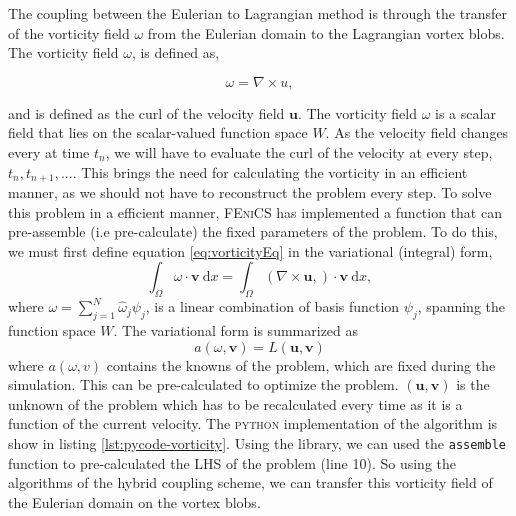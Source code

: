 The coupling between the Eulerian to Lagrangian method is through the transfer of the vorticity field $\omega$ from the Eulerian domain to the Lagrangian vortex blobs. The vorticity field $\omega$, is defined as,

	\begin{equation}
	\omega = \nabla \times u,
	\label{eq:vorticityEq}
	\end{equation}

and is defined as the curl of the velocity field $\mathbf{u}$. The vorticity field $\omega$ is  a scalar field that lies on the scalar-valued function space $W$. As the velocity field changes every at time $t_n$, we will have to evaluate the curl of the velocity at every step, $t_n, t_{n+1}, ...$. This brings the need for calculating the vorticity in an efficient manner, as we should not have to reconstruct the problem every step. To solve this problem in a efficient manner, \textsc{FEniCS} has implemented a function that can pre-assemble (i.e pre-calculate) the fixed parameters of the problem. To do this, we must first define equation \ref{eq:vorticityEq} in the variational (integral) form,  
	\begin{equation}
	\int_{\Omega} \omega \cdot \mathbf{v}\ \mathrm{d}x = \int_{\Omega} (\nabla \times \mathbf{u},) \cdot \mathbf{v}\ \mathrm{d}x,
	\end{equation}
where $\omega = \sum_{j=1}^N \hat{\omega}_j\psi_j$, is a linear combination of basis function $\psi_j$, spanning the function space $W$. The variational form is summarized as
	\begin{equation}
	a(\omega,\mathbf{v}) = L(\mathbf{u},\mathbf{v})
	\end{equation}
where $a(\omega,v)$ contains the knowns of the problem, which are fixed during the simulation. This can be pre-calculated to optimize the problem. $(\mathbf{u},\mathbf{v})$ is the unknown of the problem which has to be recalculated every time as it is a function of the current velocity. The \textsc{python} implementation of the algorithm is show in listing \ref{lst:pycode-vorticity}. Using the \dolfin library, we can used the \texttt{assemble} function to pre-calculated the LHS of the problem (line 10). So using the algorithms of the hybrid coupling scheme, we can transfer this vorticity field of the Eulerian domain on the vortex blobs.

